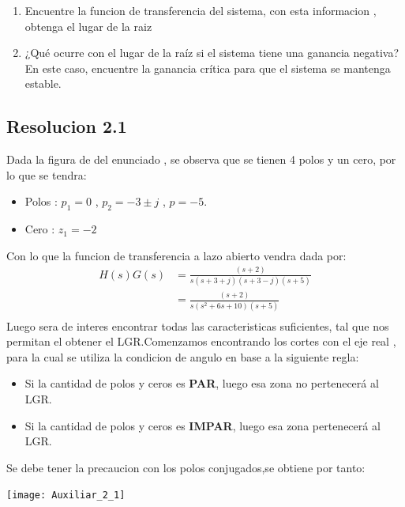 \documentclass[
  11pt,
  letterpaper,
   addpoints,
  ]{exam}
\begin{document}
\begin{questions}
\begin{center}
\end{center}
    \begin{enumerate}
        \item Encuentre la funcion de transferencia del sistema, con esta informacion , obtenga el lugar de la raiz
        \item ¿Qué ocurre con el lugar de la raíz si el sistema tiene una ganancia negativa? En este caso, encuentre la ganancia crítica para que el sistema se mantenga estable.
    \end{enumerate}
\begin{solution}
\subsection*{Resolucion 2.1}
Dada la figura de del enunciado , se observa que se tienen 4 polos y un cero, por lo que se tendra:
\begin{itemize}
    \item Polos : $p_1=0$ , $p_2=-3 \pm j$ , $p=-5$.
    \item Cero : $z_1=-2$
\end{itemize}
Con lo que la funcion de transferencia a lazo abierto vendra dada por:
\begin{align}
    H(s)G(s)&=\frac{(s+2)}{s(s+3+j)(s+3-j)(s+5)}\\
     &=\frac{(s+2)}{s(s^2+6s+10)(s+5)}\\
\end{align}
Luego sera de interes encontrar todas las caracteristicas suficientes, tal que nos permitan el obtener el LGR.Comenzamos encontrando los cortes con el eje real , para la cual se utiliza la condicion de angulo en base a la siguiente regla: 
\begin{itemize}
    \item Si la cantidad de polos y ceros es \textbf{PAR}, luego esa zona no pertenecerá al LGR.
    \item Si la cantidad de polos y ceros es \textbf{IMPAR}, luego esa zona pertenecerá al LGR.
\end{itemize}
Se debe tener la precaucion con los polos conjugados,se obtiene por tanto:
\begin{center}
    \texttt{[image: Auxiliar\_2\_1]}
  \end{center}

\end{solution}
\end{questions}
\end{document}
